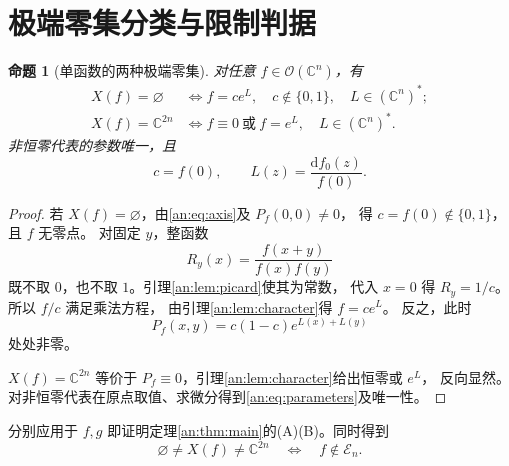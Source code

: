 \documentclass[11pt,a4paper,oneside,openany]{book}
\theoremstyle{lecture}
\newtheorem{proposition}[theorem]{命题}
\newcommand{\C}{\mathbb C}
\newcommand{\OO}{\mathcal O}
\newcommand{\En}{\mathcal E_n}
\newcommand{\dd}{\mathrm d}
\numberwithin{equation}{section}
\begin{document}
\section{极端零集分类与限制判据}\label{an:sec:empty-full}
\begin{proposition}[单函数的两种极端零集]\label{an:prop:empty-full}
对任意 $f\in\OO(\C^n)$，有
\begin{align}
 X(f)=\varnothing
 &\Longleftrightarrow f=ce^L,\quad c\notin\{0,1\},\quad L\in(\C^n)^*;\label{an:eq:emptysingle}\\
 X(f)=\C^{2n}
 &\Longleftrightarrow f\equiv0\ \text{或}\ f=e^L,\quad L\in(\C^n)^*.\label{an:eq:fullsingle}
\end{align}
非恒零代表的参数唯一，且
\begin{equation}\label{an:eq:parameters}
 c=f(0),\qquad L(z)=\frac{\dd f_0(z)}{f(0)}.
\end{equation}
\end{proposition}
\begin{proof}
若 $X(f)=\varnothing$，由\eqref{an:eq:axis}及 $P_f(0,0)\ne0$，
得 $c=f(0)\notin\{0,1\}$，且 $f$ 无零点。
对固定 $y$，整函数
\[
 R_y(x)=\frac{f(x+y)}{f(x)f(y)}
\]
既不取 $0$，也不取 $1$。引理\ref{an:lem:picard}使其为常数，
代入 $x=0$ 得 $R_y=1/c$。所以 $f/c$ 满足乘法方程，
由引理\ref{an:lem:character}得 $f=ce^L$。
反之，此时
\begin{equation}\label{an:eq:defectexp}
 P_f(x,y)=c(1-c)e^{L(x)+L(y)}
\end{equation}
处处非零。

$X(f)=\C^{2n}$ 等价于 $P_f\equiv0$，引理\ref{an:lem:character}给出恒零或 $e^L$，
反向显然。对非恒零代表在原点取值、求微分得到\eqref{an:eq:parameters}及唯一性。
\end{proof}
分别应用于 $f,g$ 即证明定理\ref{an:thm:main}的(A)(B)。同时得到
\begin{equation}\label{an:eq:complement}
 \varnothing\ne X(f)\ne\C^{2n}\quad\Longleftrightarrow\quad f\notin\En.
\end{equation}
\end{document}
